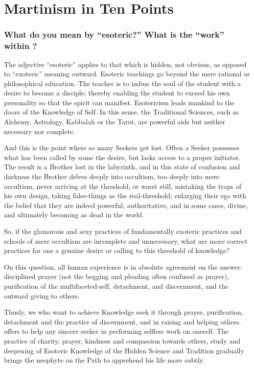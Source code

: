 \chapter{Martinism in Ten Points}

\subsection*{What do you mean by ``esoteric?'' What is the ``work'' within \moup{}?}

The adjective ``esoteric'' applies to that which is hidden, not obvious, as opposed to
``exoteric'' meaning outward. Esoteric teachings go beyond the mere rational or
philosophical education. The teacher is to imbue the soul of the student with a desire to
become a disciple; thereby enabling the student to exceed his own personality so that the
spirit can manifest. Esotericism leads mankind to the doors of the Knowledge of Self. In
this sense, the Traditional Sciences, such as Alchemy, Astrology, Kabbalah or the Tarot, are powerful aids but neither necessary nor complete.

\begin{quotebox}
And this is the point where so many Seekers get lost. Often a Seeker possesses what has
been called by some the desire, but lacks access to a proper initiator. The result is a Brother lost in the labyrinth, and in this state of confusion and darkness the Brother delves deeply
into occultism, too deeply into mere occultism, never arriving at the threshold, or worst
still, mistaking the traps of his own design, taking false-things as the real-threshold;
enlarging their ego with the belief that they are indeed powerful, authoritative, and in some
cases, divine, and ultimately becoming as dead in the world.
\end{quotebox}

So, if the glamorous and sexy practices of fundamentally exoteric practices and schools of
mere occultism are incomplete and unnecessary, what are more correct practices for one a
genuine desire or calling to this threshold of knowledge?

On this question, all human experience is in absolute agreement on the answer: disciplined
prayer (not the begging and pleading often confused as prayer), purification of the
multifaceted-self, detachment, and discernment, and the outward giving to others.

Thusly, we who want to achieve Knowledge seek it through prayer, purification,
detachment and the practice of discernment, and in raising and helping others. \moup{} offers to help any sincere seeker in performing 
selfless work on oneself. The practice of charity, prayer, kindness and compassion towards
others, study and deepening of Esoteric Knowledge of the Hidden Science and Tradition
gradually brings the neophyte on the Path to apprehend his life more subtly.

